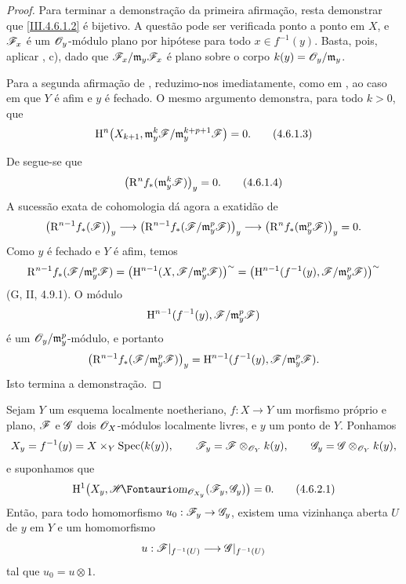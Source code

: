 \begin{proof}
Para terminar a demonstração da primeira afirmação, resta demonstrar
que \eqref{III.4.6.1.2} é bijetivo. A questão pode ser verificada ponto a ponto em
$X$, e $\mathscr{F}_x$ é um $\mathscr{O}_y$-módulo plano por hipótese para
todo $x\in f^{-1}(y)$. Basta, pois, aplicar
, c), dado que
$\mathscr{F}_x/\mathfrak m_y\mathscr{F}_x$ é plano sobre o corpo
$k(y)=\mathscr{O}_y/\mathfrak m_y$.

Para a segunda afirmação de , reduzimo-nos imediatamente, como
em , ao caso em que $Y$ é afim e $y$ é
fechado. O mesmo argumento demonstra, para todo $k>0$, que
\[
\label{III.4.6.1.3}
  \HH^n\bigl(X_{k+1},
    \mathfrak m_y^k\sh{F}/
      \mathfrak m_y^{k+p+1}\sh{F}\bigr)=0.
  \tag{4.6.1.3}
\]


De  segue-se que
\[
\label{III.4.6.1.4}
  \bigl(\RR^n f_*(\mathfrak m_y^k\sh{F})\bigr)_y=0.
  \tag{4.6.1.4}
\]
A sucessão exata de cohomologia dá agora a exatidão de
\[
  \bigl(\mathrm{R}^{n-1}f_*(\mathscr{F})\bigr)_y
  \longrightarrow
  \bigl(\mathrm{R}^{n-1}f_*
    (\mathscr{F}/\mathfrak m_y^p\mathscr{F})\bigr)_y
  \longrightarrow
  \bigl(\mathrm{R}^n f_*(\mathfrak m_y^p\mathscr{F})\bigr)_y=0.
\]
Como $y$ é fechado e $Y$ é afim, temos
\[
  \mathrm{R}^{n-1}f_*(\mathscr{F}/\mathfrak m_y^p\mathscr{F})
  =
  \bigl(\mathrm{H}^{n-1}
    (X,\mathscr{F}/\mathfrak m_y^p\mathscr{F})\bigr)^{\sim}
  =
  \bigl(\mathrm{H}^{n-1}
    (f^{-1}(y),\mathscr{F}/\mathfrak m_y^p\mathscr{F})\bigr)^{\sim}
\]
(G, II, 4.9.1). O módulo
\[
  \mathrm{H}^{n-1}
    (f^{-1}(y),\mathscr{F}/\mathfrak m_y^p\mathscr{F})
\]
é um $\mathscr{O}_y/\mathfrak m_y^p$-módulo, e portanto
\[
  \bigl(\mathrm{R}^{n-1}f_*
    (\mathscr{F}/\mathfrak m_y^p\mathscr{F})\bigr)_y
  =
  \mathrm{H}^{n-1}
    (f^{-1}(y),\mathscr{F}/\mathfrak m_y^p\mathscr{F}).
\]
Isto termina a demonstração.
\end{proof}

\begin{corollary}[4.6.2]
\label{III.4.6.2}
Sejam $Y$ um esquema localmente noetheriano, $f:X\to Y$ um
morfismo próprio e plano, $\mathscr{F}$ e $\mathscr{G}$ dois
$\mathscr{O}_X$-módulos localmente livres, e $y$ um ponto de $Y$. Ponhamos
\[
  X_y=f^{-1}(y)=X\times_Y\operatorname{Spec}(k(y)),\qquad
  \mathscr{F}_y=\mathscr{F}\otimes_{\mathscr{O}_Y}k(y),\qquad
  \mathscr{G}_y=\mathscr{G}\otimes_{\mathscr{O}_Y}k(y),
\]
e suponhamos que
\[
\label{III.4.6.2.1}
  \HH^1\bigl(
    X_y,\shHom_{\sh{O}_{X_y}}(\sh{F}_y,\sh{G}_y)
  \bigr)=0.
  \tag{4.6.2.1}
\]
Então, para todo homomorfismo $u_0:\sh{F}_y\to\sh{G}_y$, existem
uma vizinhança aberta $U$ de $y$ em $Y$ e um homomorfismo
\[
  u:\mathscr{F}|_{f^{-1}(U)}\longrightarrow
    \mathscr{G}|_{f^{-1}(U)}
\]
tal que $u_0=u\otimes1$.
\end{corollary}


